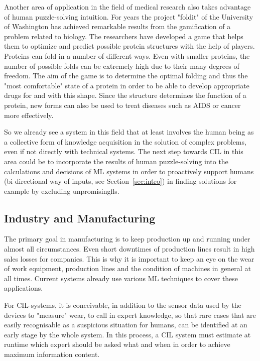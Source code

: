 \documentclass[conference]{IEEEtran}
\begin{document}
Another area of application in the field of medical research also takes advantage of human puzzle-solving intuition. 
For years the project "foldit" of the University of Washington has achieved remarkable results\cite{Foldit:results} from the gamification of a problem related to biology.
The researchers have developed a game that helps them to optimize and predict possible protein structures with the help of 
players\cite{Foldit:web}.
Proteins can fold in a number of different ways. Even with smaller proteins, the number of possible folds can be extremely high due to their many degrees of freedom.
The aim of the game is to determine the optimal folding and thus the "most comfortable" state of a protein in order to be able to develop appropriate drugs for and with this shape.
Since the structure determines the function of a protein\cite{Foldit:web}, new forms can also be used to treat diseases such as AIDS or cancer more effectively.

So we already see a system in this field that at least involves the human being as a collective form of knowledge acquisition in the solution of complex problems, even if not directly with technical systems.
The next step towards CIL in this area could be to incorporate the results of human puzzle-solving into the calculations and decisions of ML systems in order to proactively support humans (bi-directional way of inputs, see Section~\ref{sec:intro}) in finding solutions 
for example by excluding unpromisingfls.


\subsection{Industry and Manufacturing}
The primary goal in manufacturing is to keep production up and running under almost all circumstances. 
Even short downtimes of production lines result in high sales losses for companies.
This is why it is important to keep an eye on the wear of work equipment, production lines and the condition of machines in general at all times.
Current systems already use various ML techniques\cite{Manu:wuest} to cover these applications.

For CIL-systems, it is conceivable, in addition to the sensor data used by the devices to "measure" wear, to call in expert knowledge, so that rare cases that are easily recognisable as a suspicious situation for humans, can be identified at an early stage by the whole system.
In this process, a CIL system must estimate at runtime which expert should be asked what and when in order 
to achieve maximum information content.
\end{document}
